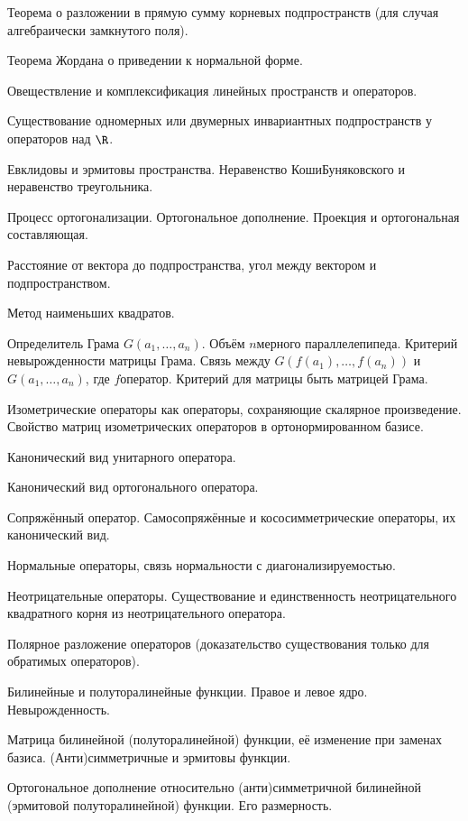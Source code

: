 \documentclass[a4paper]{article}
\begin{document}
\begin{nums}{-2}
\item Теорема о разложении в прямую сумму корневых подпространств (для случая алгебраически замкнутого поля).
\item Теорема Жордана о приведении к нормальной форме.
\item Овеществление и комплексификация линейных пространств и операторов.
\item Существование одномерных или двумерных инвариантных подпространств у операторов над $\R$.
\item Евклидовы и эрмитовы пространства. Неравенство Коши\ч Буняковского и неравенство треугольника.
\item Процесс ортогонализации. Ортогональное дополнение. Проекция и ортогональная составляющая.
\item Расстояние от вектора до подпространства, угол между вектором и подпространством.
\item Метод наименьших квадратов.
\item Определитель Грама $G(a_1,\ldots,a_n)$. Объём $n$\д мерного параллелепипеда. Критерий невырожденности
матрицы Грама. Связь между
$G(f(a_1),\ldots,f(a_n))$ и $G(a_1,\ldots,a_n)$, где $f$\т оператор. Критерий для матрицы быть матрицей Грама.
\item Изометрические операторы как операторы, сохраняющие скалярное произведение. Свойство матриц
изометрических операторов в ортонормированном базисе.
\item Канонический вид унитарного оператора.
\item Канонический вид ортогонального оператора.
\item Сопряжённый оператор. Самосопряжённые и кососимметрические операторы, их канонический вид.
\item Нормальные операторы, связь нормальности с диагонализируемостью.
\item Неотрицательные операторы. Существование и единственность неотрицательного квадратного корня из неотрицательного оператора.
\item Полярное разложение операторов (доказательство существования только для обратимых операторов).
\item Билинейные и полуторалинейные функции. Правое и левое ядро. Невырожденность.
\item Матрица билинейной (полуторалинейной) функции, её изменение при заменах базиса. (Анти)симметрич\-ные и эрмитовы функции.
\item Ортогональное дополнение относительно (анти)симметричной билинейной (эрмитовой полуторалинейной) функции. Его размерность.

\end{nums}
\end{document}
